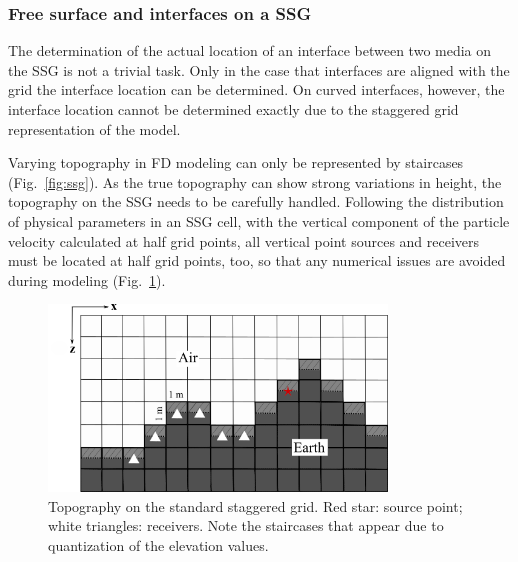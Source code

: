 \subsubsection{Free surface and interfaces on a SSG}
The determination of the actual location of an interface between two media on the SSG is not a trivial task. Only in the case that interfaces are aligned with the grid the interface location can be determined. On curved interfaces, however, the interface location cannot be determined exactly due to the staggered grid representation of the model. 

Varying topography in FD modeling can only be represented by staircases (Fig.~\ref{fig:ssg}). As the true topography can show strong variations in height, the topography on the SSG needs to be carefully handled. Following the distribution of physical parameters in an SSG cell, with the vertical component of the particle velocity calculated at half grid points, all vertical point sources and receivers must be located at half grid points, too, so that any numerical issues are avoided during modeling (Fig.~\ref{fig:ssg_topo}). 
\begin{figure}[ht!]
    \centering
    \includegraphics[width=9cm]{figures/topo.png}
    \caption{Topography on the standard staggered grid. Red star: source point; white triangles: receivers. Note the staircases that appear due to quantization of the elevation values.}
    \label{fig:ssg_topo}
\end{figure}

